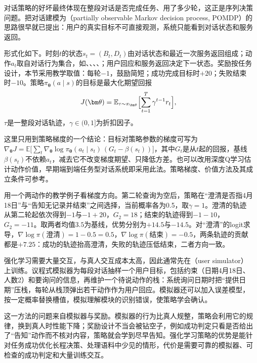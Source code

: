 对话策略的好坏最终体现在整段对话是否完成任务、用了多少轮，这正是序列决策问题。把对话建模为（partially observable Markov decision process, POMDP）的思路很早就已提出\cite{nlp-dialogue-levin2000,nlp-dialogue-young2013}：用户的真实目标不可直接观测，系统只能看到对话状态和服务返回。

形式化如下。时刻$t$的状态$s_t=(B_t,D_t)$由对话状态和最近一次服务返回组成；动作$a_t$取自对话行为集合，如、、、、；用户回应和服务返回决定下一状态。奖励按任务设计，本节采用教学取值：每轮$-1$，鼓励简短；成功完成目标时$+20$；失败结束时$-10$。策略$\pi_{\bm\theta}(a\mid s)$的目标是最大化期望回报
\begin{equation}
 J(\bm\theta)=\mathbb{E}_{\tau\sim\pi_{\bm\theta}}\Bigl[\sum_{t=1}^{T}\gamma^{t-1}r_t\Bigr],
 \label{eq:nlp-dialogue-rl-objective}
\end{equation}
$\tau$是一整段对话轨迹，$\gamma\in(0,1]$为折扣因子。

这里只用到策略梯度的一个结论：目标对策略参数的梯度可写为$\nabla_{\bm\theta}J=\mathbb{E}\bigl[\sum_t\nabla_{\bm\theta}\log\pi_{\bm\theta}(a_t\mid s_t)\,(G_t-\beta(s_t))\bigr]$，其中$G_t$是从$t$起的回报，基线$\beta(s_t)$不依赖$a_t$，减去它不改变梯度期望、只降低方差。也可以改用深度Q学习估计动作价值，早期端到端任务型对话系统即采用此法。策略梯度、价值方法及其成立条件可参考。

用一个两动作的教学例子看梯度方向。第二轮查询为空后，策略在“澄清是否指4月18日”与“告知无记录并结束”之间选择，当前概率各为0.5，取$\gamma=1$。澄清的轨迹从第二轮起依次得到$-1$与$-1+20$，$G_2=18$；结束的轨迹得到$-1-10$，$G_2=-11$。取两者均值$3.5$为基线，优势分别为$+14.5$与$-14.5$。对“澄清”的logit求导，$\nabla\log\pi(\text{澄清})=1-0.5=0.5$，$\nabla\log\pi(\text{结束})=-0.5$，两条轨迹的贡献都是$+7.25$：成功的轨迹抬高澄清，失败的轨迹压低结束，二者方向一致。

强化学习需要大量交互，与真人交互成本太高，因此通常先在（user simulator）上训练。议程式模拟器为每段对话抽样一个用户目标，包括约束（日期4月18日、人数2）和要询问的信息，再维护一个待说动作的栈：系统询问日期时把“提供日期”压栈，每轮从栈顶弹出若干动作作为用户回应。模拟器还可以加入误差模型，按一定概率替换槽值，模拟理解模块的识别错误，使策略学会确认。

这一方法的问题来自模拟器与奖励。模拟器的行为比真人规整，策略会利用它的规律，换到真人时性能下降；奖励设计不当会被钻空子，例如成功判定只看是否给出了“告知”动作而不核对内容，策略就会学到尽早告知。强化学习策略的优势是能针对任务成功优化长程决策、处理语料中少见的情形，代价是需要可靠的模拟器、可检查的成功判定和大量训练交互。

